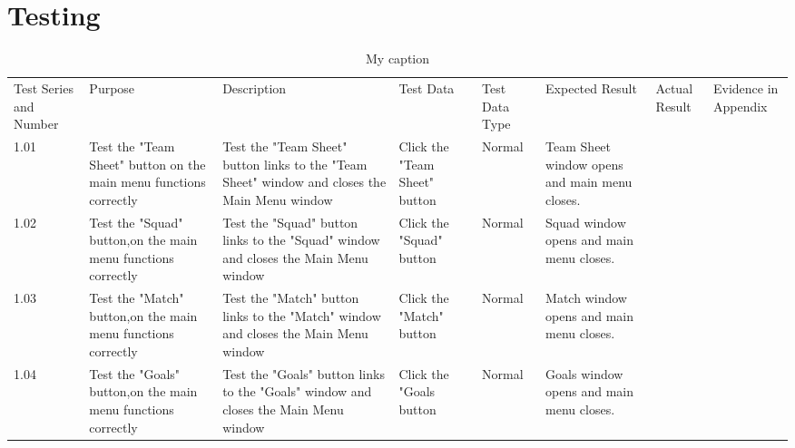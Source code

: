 \section{Testing}
\begin{table}[]
	\centering
	\caption{My caption}
	\label{my-label}
	\begin{tabular}{llllllll}
		Test Series and Number & Purpose                                                                          & Description                                                                                                               & Test Data                                                             & Test Data Type                                                          & Expected Result                                                                               & Actual Result & Evidence in Appendix \\
		1.01                   & Test the "Team Sheet" button on the main menu functions correctly                & Test the "Team Sheet" button links to the "Team Sheet" window and closes the Main Menu window                             & Click the "Team Sheet" button                                         & Normal                                                                  & Team Sheet window opens and main menu closes.                                                 &               &                      \\
		1.02                   & Test the "Squad" button,on the main menu functions correctly                     & Test the "Squad" button links to the "Squad" window and closes the Main Menu window                                       & Click the "Squad" button                                              & Normal                                                                  & Squad window opens and main menu closes.                                                      &               &                      \\
		1.03                   & Test the "Match" button,on the main menu functions correctly                     & Test the "Match" button links to the "Match" window and closes the Main Menu window                                       & Click the "Match" button                                              & Normal                                                                  & Match window opens and main menu closes.                                                      &               &                      \\
		1.04                   & Test the "Goals" button,on the main menu functions correctly                     & Test the "Goals" button links to the "Goals" window and closes the Main Menu window                                       & Click the "Goals button                                               & Normal                                                                  & Goals window opens and main menu closes.                                                      &               &                      \\

\end{tabular}
\end{table}
